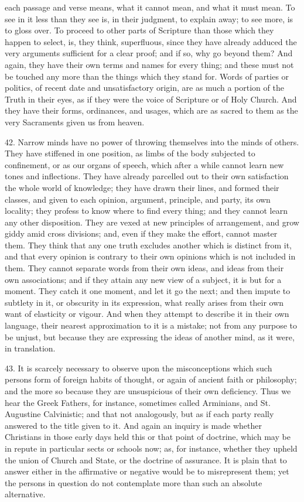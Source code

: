 each passage and verse means, what it cannot mean, and what it must
mean. To see in it less than they see is, in their judgment, to
explain away; to see more, is to gloss over. To proceed to other parts
of Scripture than those which they happen to select, is, they think,
superfluous, since they have already adduced the very arguments
sufficient for a clear proof; and if so, why go beyond them? And
again, they have their own terms and names for every thing; and these
must not be touched any more than the things which they stand for.
Words of parties or politics, of recent date and unsatisfactory
origin, are as much a portion of the Truth in their eyes, as if they
were the voice of Scripture or of Holy Church. And they have their
forms, ordinances, and usages, which are as sacred to them as the very
Sacraments given us from heaven.

42. Narrow minds have no power of throwing themselves into the
minds of others. They have stiffened in one position, as limbs of the
body subjected to confinement, or as our organs of speech, which after
a while cannot learn new tones and inflections. They have already
parcelled out to their own satisfaction the whole world of knowledge;
they have drawn their lines, and formed their classes, and given to
each opinion, argument, principle, and party, its own locality; they
profess to know where to find every thing; and they cannot learn any
other disposition. They are vexed at new principles of arrangement,
and grow giddy amid cross divisions; and, even if they make the
effort, cannot master them. They think that any one truth excludes
another which is distinct from it, and that every opinion is contrary
to their own opinions which is not included in them. They cannot
separate words from their own ideas, and ideas from their own
associations; and if they attain any new view of a subject, it is but
for a moment. They catch it one moment, and let it go the next; and
then impute to subtlety in it, or obscurity in its expression, what
really arises from their own want of elasticity or vigour. And when
they attempt to describe it in their own language, their nearest
approximation to it is a mistake; not from any purpose to be unjust,
but because they are expressing the ideas of another mind, as it were,
in translation.

43. It is scarcely necessary to observe upon the misconceptions
which such persons form of foreign habits of thought, or again of
ancient faith or philosophy; and the more so because they are
unsuspicious of their own deficiency. Thus we hear the Greek Fathers,
for instance, sometimes called Arminians, and St. Augustine
Calvinistic; and that not analogously, but as if each party really
answered to the title given to it. And again an inquiry is made
whether Christians in those early days held this or that point of
doctrine, which may be in repute in particular sects or schools now;
as, for instance, whether they upheld the union of Church and State,
or the doctrine of assurance. It is plain that to answer either in the
affirmative or negative would be to misrepresent them; yet the persons
in question do not contemplate more than such an absolute alternative.

